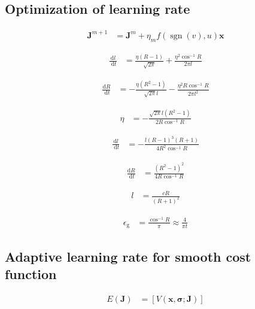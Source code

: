 \documentclass{article}
\begin{document}
\subsection{Optimization of learning rate}

\begin{align*}
\boldsymbol{J}^{m+1} &= \boldsymbol{J}^{m} + \eta_{m} f(\operatorname{sgn}(v), u) \boldsymbol{x} \tag{8.74}
\end{align*}

\begin{align*}
\frac{\mathrm{d} l}{\mathrm{~d} t} &= \frac{\eta(R - 1)}{\sqrt{2 \pi}} + \frac{\eta^{2} \cos^{-1} R}{2 \pi l} \tag{8.75}
\end{align*}

\begin{align*}
\frac{\mathrm{d} R}{\mathrm{~d} t} &= -\frac{\eta(R^{2} - 1)}{\sqrt{2 \pi} l} - \frac{\eta^{2} R \cos^{-1} R}{2 \pi l^{2}} \tag{8.76}
\end{align*}

\begin{align*}
\eta &= -\frac{\sqrt{2 \pi} l(R^{2} - 1)}{2 R \cos^{-1} R} \tag{8.77}
\end{align*}

\begin{align*}
\frac{\mathrm{d} l}{\mathrm{~d} t} &= -\frac{l(R - 1)^{3}(R + 1)}{4 R^{2} \cos^{-1} R} \tag{8.78}
\end{align*}

\begin{align*}
\frac{\mathrm{d} R}{\mathrm{~d} t} &= \frac{(R^{2} - 1)^{2}}{4 R \cos^{-1} R}
\tag{8.79}
\end{align*}

\begin{align*}
l &= \frac{c R}{(R + 1)^{2}}
\tag{8.80}
\end{align*}

\begin{align*}
\epsilon_{\mathrm{g}} &= \frac{\cos^{-1} R}{\pi} \approx \frac{4}{\pi t}
\tag{8.81}
\end{align*}

\subsection{Adaptive learning rate for smooth cost function}

\begin{align*}
E(\boldsymbol{J}) &= [V(\boldsymbol{x}, \boldsymbol{\sigma}; \boldsymbol{J})]
\tag{8.82}
\end{align*}
\end{document}
